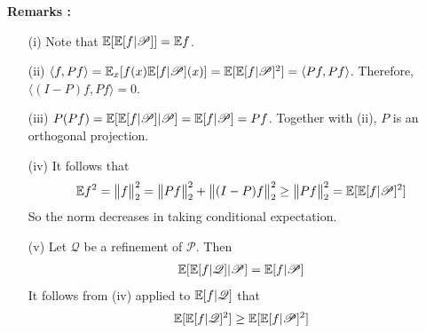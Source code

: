 \documentclass[10pt,a4paper]{report}
\begin{document}
\textbf{Remarks :}
\begin{itemize}
\item[(i)] Note that $\mathbb{E}[\mathbb{E}[f|\mathscr{P}]] = \mathbb{E} f$.
\item[(ii)] $\langle f, Pf \rangle =  \mathbb{E}_x [ f(x) \mathbb{E}[f|\mathscr{P}](x) ] = \mathbb{E} [\mathbb{E}[f|\mathscr{P}]^2 ] = \langle Pf, Pf \rangle$. Therefore, $\langle (I-P)f, Pf \rangle =0$.
\item[(iii)] $P(Pf) = \mathbb{E}[\mathbb{E}[f|\mathscr{P}]|\mathscr{P}] = \mathbb{E}[f| \mathscr{P}] = Pf$. Together with (ii), $P$ is an orthogonal projection.
\item[(iv)] It follows that
\begin{align*}
\mathbb{E} f^2 = \bigl\lVert f\bigr\rVert_{2}^2 = \bigl\lVert Pf\bigr\rVert_{2}^2 + \bigl\lVert(I-P)f\bigr\rVert_{2}^2 \geq \bigl\lVert Pf\bigr\rVert_{2}^2 = \mathbb{E}[\mathbb{E}[f|\mathscr{P}]^2]
\end{align*}
So the norm decreases in taking conditional expectation.
\item[(v)] Let $\mathscr{Q}$ be a refinement of $\mathscr{P}$. Then
\begin{align*}
\mathbb{E}[\mathbb{E}[f|\mathscr{Q}]|\mathscr{P}] = \mathbb{E}[f| \mathscr{P}]
\end{align*}
It follows from (iv) applied to $\mathbb{E}[f|\mathscr{Q}]$ that
\begin{align*}
\mathbb{E}[\mathbb{E}[f|\mathscr{Q}]^2 ] \geq \mathbb{E} [ \mathbb{E}[f|\mathscr{P}]^2 ]
\end{align*}
\end{itemize}
\end{document}
